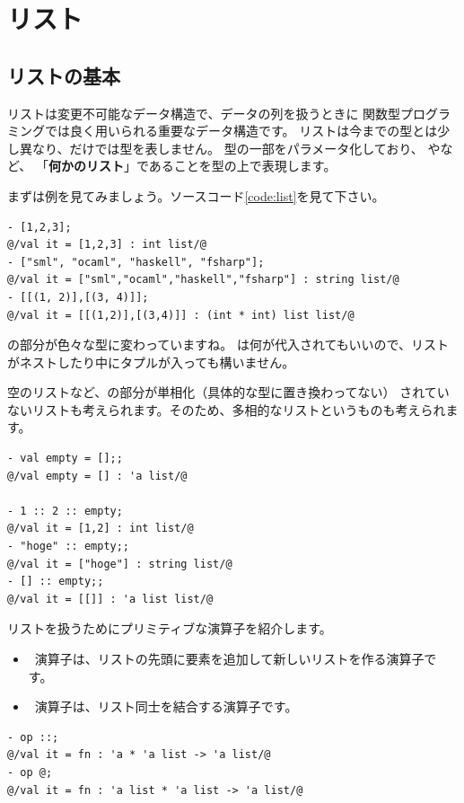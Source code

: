 \documentclass[11pt,a4paper]{article}
\begin{document}
\label{sec:list}
\section{リスト}
\subsection{リストの基本}
リストは変更不可能なデータ構造で、データの列を扱うときに
関数型プログラミングでは良く用いられる重要なデータ構造です。
リストは今までの型とは少し異なり、だけでは型を表しません。
型の一部をパラメータ化しており、
やなど、
「{\bfseries 何かのリスト}」であることを型の上で表現します。

まずは例を見てみましょう。ソースコード\ref{code:list}を見て下さい。

\begin{lstlisting}[caption=色々なリスト,label=code:list]
- [1,2,3];
@/val it = [1,2,3] : int list/@
- ["sml", "ocaml", "haskell", "fsharp"];
@/val it = ["sml","ocaml","haskell","fsharp"] : string list/@
- [[(1, 2)],[(3, 4)]];
@/val it = [[(1,2)],[(3,4)]] : (int * int) list list/@
\end{lstlisting}

の部分が色々な型に変わっていますね。
は何が代入されてもいいので、リストがネストしたり中にタプルが入っても構いません。

空のリストなど、の部分が単相化（具体的な型に置き換わってない）
されていないリストも考えられます。そのため、多相的なリストというものも考えられます。

\begin{lstlisting}[caption=多相的なリスト,label=code:poly-list]
- val empty = [];;
@/val empty = [] : 'a list/@

- 1 :: 2 :: empty;
@/val it = [1,2] : int list/@
- "hoge" :: empty;;
@/val it = ["hoge"] : string list/@
- [] :: empty;;
@/val it = [[]] : 'a list list/@
\end{lstlisting}

リストを扱うためにプリミティブな演算子を紹介します。
\begin{itemize}
\item \prog{::} \ 演算子は、リストの先頭に要素を追加して新しいリストを作る演算子です。
\item {} \ 演算子は、リスト同士を結合する演算子です。
\end{itemize}

\begin{lstlisting}[caption=リスト操作演算子の型,label=code:list-operators]
- op ::;
@/val it = fn : 'a * 'a list -> 'a list/@
- op @;
@/val it = fn : 'a list * 'a list -> 'a list/@
\end{lstlisting}
\end{document}
